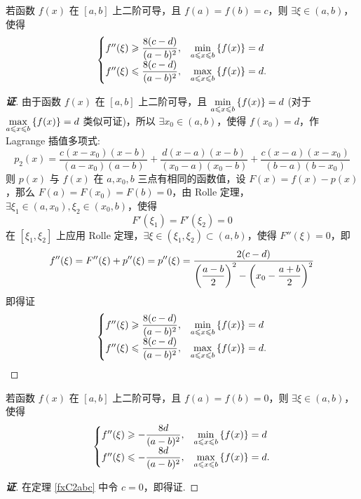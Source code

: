 \begin{theorem}
    若函数 $f(x)\text{ 在 }[a,b]$ 上二阶可导，且 $f(a)=f(b)=c$，则 $\exists\xi\in(a,b)$，\label{fxC2abc}使得 $$\begin{cases}
            f''(\xi)\geqslant \dfrac{8(c-d)}{(a-b)^2}, & \min\limits_{a\leqslant x\leqslant b}\qty{f(x)}=d  \\
            f''(\xi)\leqslant \dfrac{8(c-d)}{(a-b)^2}, & \max\limits_{a\leqslant x\leqslant b}\qty{f(x)}=d.
        \end{cases}$$
\end{theorem}
\begin{proof}[{\songti \textbf{证}}]
    由于函数 $f(x)\text{ 在 }[a,b]$ 上二阶可导，且 $\min\limits_{a\leqslant x\leqslant b}\qty{f(x)}=d$ (对于 $\max\limits_{a\leqslant x\leqslant b}\qty{f(x)}=d$ 类似可证)，所以 $\exists x_0\in(a,b)$，使得 $f(x_0)=d$，作 Lagrange 插值多项式:
    $$p_2(x)=\dfrac{c(x-x_0)(x-b)}{(a-x_0)(a-b)}+\dfrac{d(x-a)(x-b)}{(x_0-a)(x_0-b)}+\dfrac{c(x-a)(x-x_0)}{(b-a)(b-x_0)}$$
    则 $p(x)$ 与 $f(x)$ 在 $a,x_0,b$ 三点有相同的函数值，设 $F(x)=f(x)-p(x)$，那么 $F(a)=F(x_0)=F(b)=0$，由 Rolle 定理，$\exists\xi_1\in(a,x_0),\xi_2\in(x_0,b)$，使得 $$F'(\xi_1)=F'(\xi_2)=0$$
    在 $[\xi_1,\xi_2]$ 上应用 Rolle 定理，$\exists\xi\in(\xi_1,\xi_2)\subset(a,b)$，使得 $F''(\xi)=0$，即 $$f''(\xi)=F''(\xi)+p''(\xi)=p''(\xi)=\dfrac{2(c-d)}{\qty(\dfrac{a-b}{2})^2-\qty(x_0-\dfrac{a+b}{2})^2}$$
    即得证 $$\begin{cases}
            f''(\xi)\geqslant \dfrac{8(c-d)}{(a-b)^2}, & \min\limits_{a\leqslant x\leqslant b}\qty{f(x)}=d  \\
            f''(\xi)\leqslant \dfrac{8(c-d)}{(a-b)^2}, & \max\limits_{a\leqslant x\leqslant b}\qty{f(x)}=d.
        \end{cases}$$
\end{proof}
\begin{inference}
    若函数 $f(x)\text{ 在 }[a,b]$ 上二阶可导，且 $f(a)=f(b)=0$，则 $\exists\xi\in(a,b)$，使得 $$\begin{cases}
            f''(\xi)\geqslant -\dfrac{8d}{(a-b)^2}, & \min\limits_{a\leqslant x\leqslant b}\qty{f(x)}=d  \\
            f''(\xi)\leqslant -\dfrac{8d}{(a-b)^2}, & \max\limits_{a\leqslant x\leqslant b}\qty{f(x)}=d.
        \end{cases}$$
\end{inference}
\begin{proof}[{\songti \textbf{证}}]
    在定理 \ref{fxC2abc} 中令 $c=0$，即得证.
\end{proof}

